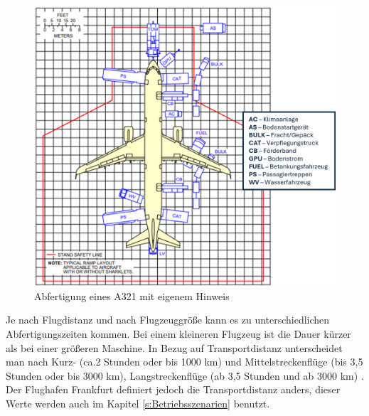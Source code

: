 \begin{figure}[h]
	\centering
	\includegraphics[width=0.8\linewidth]{Bilder/A321_Abfertigung.png}
	\caption[Abfertigung]{Abfertigung eines A321 \cite{airbus2022a321} mit eigenem Hinweis}
	\label{abfertigung}
\end{figure}



Je nach Flugdistanz und nach Flugzeuggröße kann es zu unterschiedlichen Abfertigungszeiten kommen. Bei einem kleineren Flugzeug ist die Dauer 
kürzer als bei einer größeren Maschine. 
In Bezug auf Transportdistanz unterscheidet man nach Kurz- (ca.2 Stunden oder bis 1000 km) 
und Mittelstreckenflüge (bis 3,5 Stunden oder bis 3000 km), Langstreckenflüge (ab 3,5 Stunden und ab 3000 km) \cite{mensen2013handbuch}.
Der Flughafen Frankfurt definiert jedoch die Transportdistanz anders, dieser Werte werden auch im Kapitel \ref{s:Betriebsszenarien} benutzt.


